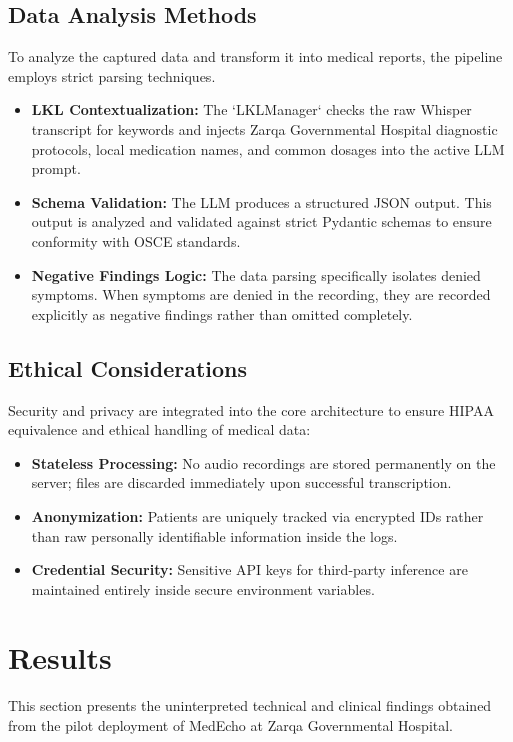 \documentclass[12pt,a4paper]{article}
\begin{document}
\subsection{Data Analysis Methods}
To analyze the captured data and transform it into medical reports, the pipeline employs strict parsing techniques. 
\begin{itemize}
    \item \textbf{LKL Contextualization:} The `LKLManager` checks the raw Whisper transcript for keywords and injects Zarqa Governmental Hospital diagnostic protocols, local medication names, and common dosages into the active LLM prompt.
    \item \textbf{Schema Validation:} The LLM produces a structured JSON output. This output is analyzed and validated against strict Pydantic schemas to ensure conformity with OSCE standards.
    \item \textbf{Negative Findings Logic:} The data parsing specifically isolates denied symptoms. When symptoms are denied in the recording, they are recorded explicitly as negative findings rather than omitted completely.
\end{itemize}

\subsection{Ethical Considerations}
Security and privacy are integrated into the core architecture to ensure HIPAA equivalence and ethical handling of medical data:
\begin{itemize}
    \item \textbf{Stateless Processing:} No audio recordings are stored permanently on the server; files are discarded immediately upon successful transcription.
    \item \textbf{Anonymization:} Patients are uniquely tracked via encrypted IDs rather than raw personally identifiable information inside the logs.
    \item \textbf{Credential Security:} Sensitive API keys for third-party inference are maintained entirely inside secure environment variables.
\end{itemize}

\section{Results}
This section presents the uninterpreted technical and clinical findings obtained from the pilot deployment of MedEcho at Zarqa Governmental Hospital.
\end{document}
